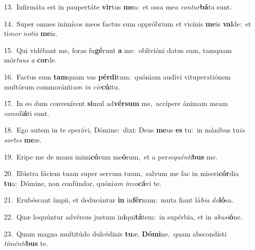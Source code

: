 {\numbfont\textcolor{\numbcolor}{13.}}~Infirmáta est in paupertáte \textbf{vir}\-tus \textbf{me}\-a:~\star et ossa me\textit{a} \textit{con}\-\textit{tur}\textbf{bá}ta sunt.\par
{\numbfont\textcolor{\numbcolor}{14.}}~Super omnes inimícos meos factus sum oppróbrium et vicínis \textbf{me}\-is \textbf{val}\-de:~\star et ti\textit{mor} \textit{no}\-\textit{tis} \textbf{me}\-is.\par
{\numbfont\textcolor{\numbcolor}{15.}}~Qui vidébant me, foras fu\-\textbf{gé}\-runt \textbf{a} me:~\star oblivióni datus sum, tamquam mór\-\textit{tu}\-\textit{us} \textit{a} \textbf{cor}\-de.\par
{\numbfont\textcolor{\numbcolor}{16.}}~Factus sum \textbf{tam}\-quam vas \textbf{pér}\-\textbf{di}tum:~\star quóniam audívi vituperatiónem multórum commoránti\textit{um} \textit{in} \textit{cir}\-\textbf{cú}itu.\par
{\numbfont\textcolor{\numbcolor}{17.}}~In eo dum convenírent \textbf{si}\-mul ad\-\textbf{vér}\-\textbf{sum} me,~\star accípere ánimam meam \textit{con}\-\textit{si}\textit{li}\textbf{á}ti sunt.\par
{\numbfont\textcolor{\numbcolor}{18.}}~Ego autem in te sperávi, Dómine:~\dagger dixi: Deus \textbf{me}\-us \textbf{es} tu:~\star in mánibus tu\textit{is} \textit{sor}\-\textit{tes} \textbf{me}\-æ.\par
{\numbfont\textcolor{\numbcolor}{19.}}~Eripe me de manu inimi\-\textbf{có}\-rum me\-\textbf{ó}\-rum,~\star et a per\-\textit{se}\-\textit{quén}\textit{ti}\textbf{bus} me.\par
{\numbfont\textcolor{\numbcolor}{20.}}~Illústra fáciem tuam super servum tuum,~\dagger salvum me fac in miseri\-\textbf{cór}\-dia \textbf{tu}\-a:~\star Dómine, non confúndar, quóni\textit{am} \textit{in}\-\textit{vo}\textbf{cá}vi te.\par
{\numbfont\textcolor{\numbcolor}{21.}}~Erubéscant ímpii, et deducántur \textbf{in} in\-\textbf{fér}\-num:~\star muta fiant lá\-\textit{bi}\-\textit{a} \textit{do}\-\textbf{ló}sa.\par
{\numbfont\textcolor{\numbcolor}{22.}}~Quæ loquúntur advérsus justum in\-\textbf{i}\-qui\-\textbf{tá}\-tem:~\star in supérbia, et in \textit{ab}\-\textit{u}\textit{si}\textbf{ó}ne.\par
{\numbfont\textcolor{\numbcolor}{23.}}~Quam magna multitúdo dulcédinis \textbf{tu}\-æ, \textbf{Dó}\-\textbf{mi}ne,~\star quam abscondísti \textit{ti}\-\textit{mén}\textit{ti}\textbf{bus} te.\par
